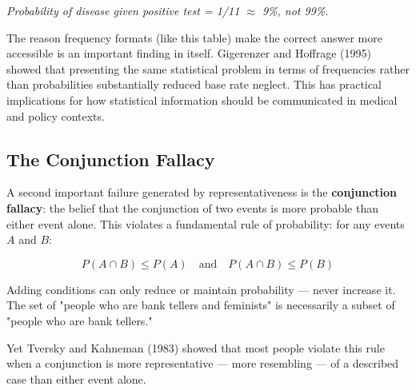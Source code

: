 \documentclass[12pt, letterpaper]{article}
\begin{document}
\textit{Probability of disease given positive test = 1/11 $\approx$ 9\%, not 99\%.}

The reason frequency formats (like this table) make the correct answer more accessible is an important finding in itself. Gigerenzer and Hoffrage (1995) showed that presenting the same statistical problem in terms of frequencies rather than probabilities substantially reduced base rate neglect. This has practical implications for how statistical information should be communicated in medical and policy contexts.




\subsection{The Conjunction Fallacy}


A second important failure generated by representativeness is the \textbf{conjunction fallacy}: the belief that the conjunction of two events is more probable than either event alone. This violates a fundamental rule of probability: for any events $A$ and $B$:

$$P(A \cap B) \leq P(A) \quad \text{and} \quad P(A \cap B) \leq P(B)$$

Adding conditions can only reduce or maintain probability --- never increase it. The set of "people who are bank tellers and feminists" is necessarily a subset of "people who are bank tellers."

Yet Tversky and Kahneman (1983) showed that most people violate this rule when a conjunction is more representative --- more resembling --- of a described case than either event alone.
\end{document}
